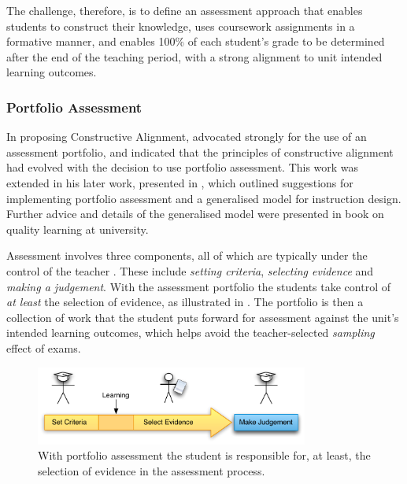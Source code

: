 The challenge, therefore, is to define an assessment approach that enables students to construct their knowledge, uses coursework assignments in a formative manner, and enables 100\% of each student's grade to be determined after the end of the teaching period, with a strong alignment to unit intended learning outcomes.

\clearpage
\subsubsection{Portfolio Assessment} %
\label{sub:portfolio_assessment}

In proposing Constructive Alignment, \citet{Biggs:1996c} advocated strongly for the use of an assessment portfolio, and indicated that the principles of constructive alignment had evolved with the decision to use portfolio assessment. This work was extended in his later work, presented in \cite{Biggs:1997}, which outlined suggestions for implementing portfolio assessment and a generalised model for instruction design. Further advice and details of the generalised model were presented in \citet{Biggs:2007} book on quality learning at university.

Assessment involves three components, all of which are typically under the control of the teacher \cite{Biggs:1997}. These include \emph{setting criteria}, \emph{selecting evidence} and \emph{making a judgement}. With the assessment portfolio the students take control of \emph{at least} the selection of evidence, as illustrated in . The portfolio is then a collection of work that the student puts forward for assessment against the unit's intended learning outcomes, which helps avoid the teacher-selected \emph{sampling} effect of exams.

\begin{figure}[htbp]
	\centering
	\includegraphics[width=0.8\textwidth]{SelectEvidence}
	\caption{With portfolio assessment the student is responsible for, at least, the selection of evidence in the assessment process.}
	\label{fig:select_evidence}
\end{figure}

%
% 

